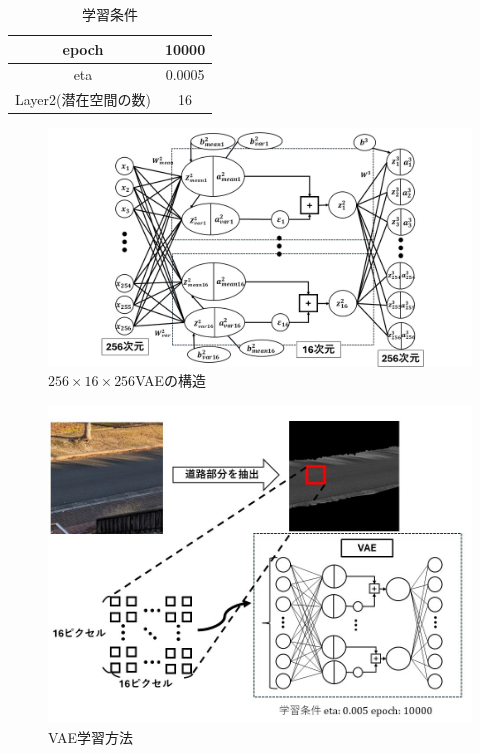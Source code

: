 \documentclass[paper]{ieicej}
\begin{document}
\begin{table}[b]
  \centering
  \caption{学習条件}
  \small
  \begin{tabular}{|c|c|} \hline
    epoch & 10000 \\ \hline
    eta & 0.0005 \\ \hline
    Layer2(潜在空間の数) & 16 \\ \hline
  \end{tabular}
  \label{tb:2}
\end{table}


\begin{figure}[tb]
  \begin{center}
    \includegraphics[width=0.98\columnwidth]{figures/VAE_1.png}
  \end{center}
  \caption{$256\times16\times256$VAEの構造}
  \label{fig:2-2-2-1}
\end{figure}

\begin{figure}[tb]
  \begin{center}
    \includegraphics[width=0.98\columnwidth]{figures/VAE_2.jpg}
  \end{center}
  \caption{VAE学習方法}
  \label{fig:2-2-2-2}
\end{figure}
\end{document}
